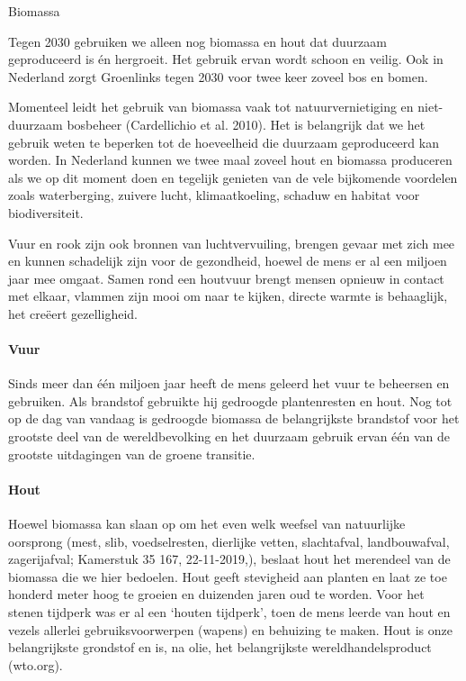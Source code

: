 \begin{voorstel}{Biomassa}

\begin{samenvatting}
Tegen 2030 gebruiken we alleen nog biomassa en hout dat duurzaam geproduceerd is én hergroeit.  Het gebruik ervan wordt schoon en veilig.  Ook in Nederland zorgt Groenlinks tegen 2030 voor twee keer zoveel bos en bomen.
\end{samenvatting}

\begin{uitdaging}
Momenteel leidt het gebruik van biomassa vaak tot natuurvernietiging en niet-duurzaam bosbeheer (Cardellichio et al. 2010). Het is belangrijk dat we het gebruik weten te beperken tot de hoeveelheid die duurzaam geproduceerd kan worden. In Nederland kunnen we twee maal zoveel hout en biomassa produceren als we op dit moment doen en tegelijk genieten van de vele bijkomende voordelen zoals waterberging, zuivere lucht, klimaatkoeling, schaduw en habitat voor biodiversiteit.

Vuur en rook zijn ook bronnen van luchtvervuiling, brengen gevaar met zich mee en kunnen schadelijk zijn voor de gezondheid, hoewel de mens er al een miljoen jaar mee omgaat. Samen rond een houtvuur brengt mensen opnieuw in contact met elkaar, vlammen zijn mooi om naar te kijken, directe warmte is behaaglijk, het creëert gezelligheid.
\end{uitdaging}

\begin{overwegingen}
\paragraph{Vuur}
Sinds meer dan één miljoen jaar heeft de mens geleerd het vuur te beheersen en gebruiken. Als brandstof gebruikte hij gedroogde plantenresten en hout. Nog tot op de dag van vandaag is gedroogde biomassa de belangrijkste brandstof voor het grootste deel van de wereldbevolking en het duurzaam gebruik ervan één van de grootste uitdagingen van de groene transitie.

\paragraph{Hout}
Hoewel biomassa kan slaan op om het even welk weefsel van natuurlijke oorsprong (mest, slib, voedselresten, dierlijke vetten, slachtafval, landbouwafval, zagerijafval; Kamerstuk 35 167, 22-11-2019,), beslaat hout het merendeel van de biomassa die we hier bedoelen. Hout geeft stevigheid aan planten en laat ze toe honderd meter hoog te groeien en duizenden jaren oud te worden. Voor het stenen tijdperk was er al een ‘houten tijdperk’, toen de mens leerde van hout en vezels allerlei gebruiksvoorwerpen (wapens) en behuizing te maken. Hout is onze belangrijkste grondstof en is, na olie, het belangrijkste wereldhandelsproduct (wto.org).


\end{overwegingen}
\end{voorstel}
